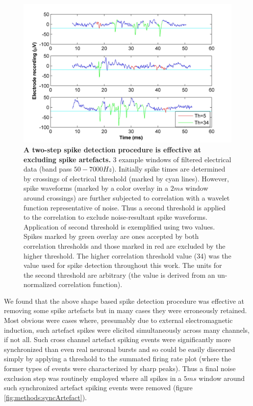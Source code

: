 \begin{figure}[!htb]
\centering
\includegraphics[width=15cm]{chapter2/figures/matchFilter/matchFilterIllustration.jpg}
\caption[Examples of spike detection and shape based artefact removal]{\textbf{A two-step spike detection procedure is effective at excluding spike artefacts.} 3 example windows of filtered electrical data (band pass \(50-7000Hz\)). Initially spike times are determined by crossings of electrical threshold (marked by cyan lines). However, spike waveforms (marked by a color overlay in a \(2ms\) window around crossings) are further subjected to correlation with a wavelet function representative of noise. Thus a second threshold is applied to the correlation to exclude noise-resultant spike waveforms. Application of second threshold is exemplified using two values. Spikes marked by green overlay are ones accepted by both correlation thresholds and those marked in red are excluded by the higher threshold. The higher correlation threshold value (34) was the value used for spike detection throughout this work. The units for the second threshold are arbitrary (the value is derived from an un-normalized correlation function).}

\label{fig:methods:matchFilter}

\end{figure}

We found that the above shape based spike detection procedure was effective at removing some spike artefacts but in many cases they were erroneously retained. Most obvious were cases where, presumably due to external electromagnetic induction, such artefact spikes were elicited simultaneously across many channels, if not all. Such cross channel artefact spiking events were significantly more synchronized than even real neuronal bursts and so could be easily discerned simply by applying a threshold to the summated firing rate plot (where the former types of events were characterized by sharp peaks). Thus a final noise exclusion step was routinely employed where all spikes in a \(5ms\) window around such synchronized artefact spiking events were removed (figure \ref{fig:methods:syncArtefact}).

